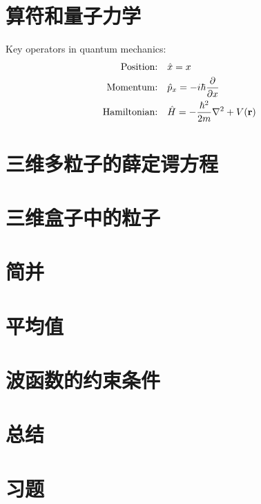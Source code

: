 \section{算符和量子力学}
Key operators in quantum mechanics:
\begin{align}
	\text{Position:} & \quad \hat{x} = x \\
	\text{Momentum:} & \quad \hat{p}_x = -i\hbar \pdv{x} \\
	\text{Hamiltonian:} & \quad \hat{H} = -\frac{\hbar^2}{2m} \nabla^2 + V(\mathbf{r})
\end{align}

\section{三维多粒子的薛定谔方程}

\section{三维盒子中的粒子}

\section{简并}

\section{平均值}

\section{波函数的约束条件}

\section*{总结}

\section*{习题}